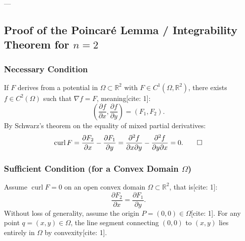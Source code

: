 ---

\subsection{Proof of the Poincaré Lemma / Integrability Theorem for \texorpdfstring{$n=2$}{n=2}}

\subsubsection*{Necessary Condition}
If $F$ derives from a potential in $\Omega \subset \mathbb{R}^2$ with $F \in C^1(\Omega, \mathbb{R}^2)$, there exists $f \in C^2(\Omega)$ such that $\nabla f = F$, meaning[cite: 1]:
\[
\left(\frac{\partial f}{\partial x}, \frac{\partial f}{\partial y}\right) = (F_1, F_2).
\]
By Schwarz's theorem on the equality of mixed partial derivatives:
\[
\operatorname{curl} F = \frac{\partial F_2}{\partial x} - \frac{\partial F_1}{\partial y} = \frac{\partial^2 f}{\partial x \partial y} - \frac{\partial^2 f}{\partial y \partial x} = 0. \qed
\]

\subsubsection*{Sufficient Condition (for a Convex Domain \texorpdfstring{$\Omega$}{Omega})}
Assume $\operatorname{curl} F = 0$ on an open convex domain $\Omega \subset \mathbb{R}^2$, that is[cite: 1]:
\[
\frac{\partial F_2}{\partial x} = \frac{\partial F_1}{\partial y}.
\]
Without loss of generality, assume the origin $P = (0, 0) \in \Omega$[cite: 1]. For any point $q = (x, y) \in \Omega$, the line segment connecting $(0,0)$ to $(x,y)$ lies entirely in $\Omega$ by convexity[cite: 1].

\begin{center}
\end{center}

